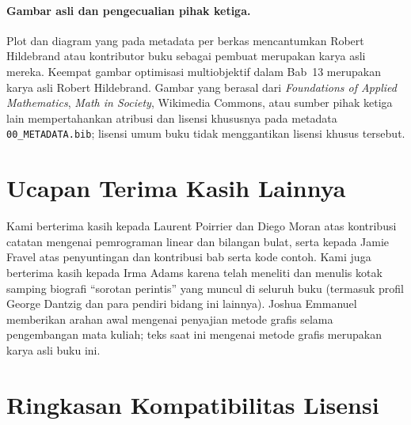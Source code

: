 \paragraph{Gambar asli dan pengecualian pihak ketiga.}
Plot dan diagram yang pada metadata per berkas mencantumkan Robert Hildebrand
atau kontributor buku sebagai pembuat merupakan karya asli mereka. Keempat
gambar optimisasi multiobjektif dalam Bab~13 merupakan karya asli Robert
Hildebrand. Gambar yang berasal dari \emph{Foundations of Applied
Mathematics}, \emph{Math in Society}, Wikimedia Commons, atau sumber pihak
ketiga lain mempertahankan atribusi dan lisensi khususnya pada metadata
\texttt{00\_METADATA.bib}; lisensi umum buku tidak menggantikan lisensi khusus
tersebut.

\section*{Ucapan Terima Kasih Lainnya}

Kami berterima kasih kepada Laurent Poirrier dan Diego Moran atas kontribusi
catatan mengenai pemrograman linear dan bilangan bulat, serta kepada Jamie
Fravel atas penyuntingan dan kontribusi bab serta kode contoh. Kami juga
berterima kasih kepada Irma Adams karena telah meneliti dan menulis kotak
samping biografi ``sorotan perintis'' yang muncul di seluruh buku (termasuk
profil George Dantzig dan para pendiri bidang ini lainnya). Joshua Emmanuel
memberikan arahan awal mengenai penyajian metode grafis selama pengembangan
mata kuliah; teks saat ini mengenai metode grafis merupakan karya asli buku ini.

\section*{Ringkasan Kompatibilitas Lisensi}

